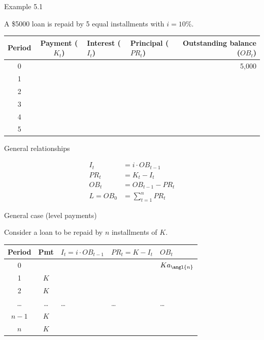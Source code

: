 \documentclass{beamer}
\begin{document}
\begin{frame}{Example 5.1}

A \$5000 loan is repaid by 5 equal installments with $i = 10\%$.

\begin{center}
\small
\renewcommand{\arraystretch}{1.5}
\begin{tabular}{c c p{} p{} r}
\toprule
Period & \shortstack{Payment\\($K_t$)} & \shortstack{Interest\\($I_t$)} & \shortstack{Principal\\($PR_t$)} & \shortstack{Outstanding\\balance ($OB_t$)} \\
\midrule
0 & & & & 5,000 \\
1 & & & & \\
2 & & & & \\
3 & & & & \\
4 & & & & \\
5 & & & & \\
\bottomrule
\end{tabular}
\end{center}

\end{frame}

\begin{frame}{General relationships}

\begin{align*}
I_t &= i \cdot OB_{t-1} \\[1ex]
PR_t &= K_t - I_t \\[1ex]
OB_t &= OB_{t-1} - PR_t \\[1ex]
L = OB_0 &= \sum_{t=1}^{n} PR_t
\end{align*}

\end{frame}

\begin{frame}{General case (level payments)}

Consider a loan to be repaid by $n$ installments of $K$.

\begin{center}
\small
\renewcommand{\arraystretch}{1.5}
\begin{tabular}{c c p{} p{} p{}}
\toprule
Period & Pmt & $I_t = i \cdot OB_{t-1}$ & $PR_t = K - I_t$ & $OB_t$ \\
\midrule
0 & & & & $K a_{\angl{n}}$ \\
1 & $K$ & & & \\
2 & $K$ & & & \\
\ldots & \ldots & \ldots & \ldots & \ldots \\
$n-1$ & $K$ & & & \\
$n$ & $K$ & & & \\
\bottomrule
\end{tabular}
\end{center}

\end{frame}
\end{document}
